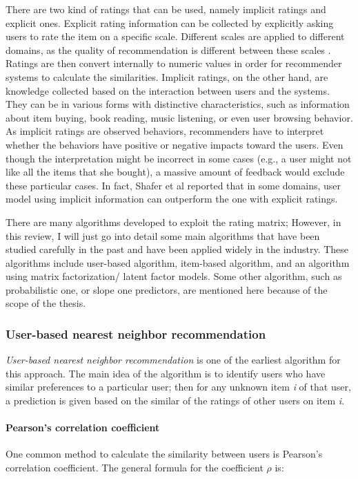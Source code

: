 There are two kind of ratings that can be used, namely implicit ratings and explicit ones. Explicit rating information can be collected by explicitly asking users to rate the item on a specific scale. Different scales are applied to different domains, as the quality of recommendation is different between these scales \cite{cosley2003seeing}. Ratings are then convert internally to numeric values in order for recommender systems to calculate the similarities. Implicit ratings, on the other hand, are knowledge collected based on the interaction between users and the systems. They can be in various forms with distinctive characteristics, such as information about item buying, book reading, music listening, or even user browsing behavior. As implicit ratings are observed behaviors, recommenders have to interpret whether the behaviors have positive or negative impacts toward the users. Even though the interpretation might be incorrect in some cases (e.g., a user might not like all the items that she bought), a massive amount of feedback would exclude these particular cases. In fact, Shafer et al \cite{schafer2006recommender} reported that in some domains, user model using implicit information can outperform the one with explicit ratings.

There are many algorithms developed to exploit the rating matrix; However, in this review, I will just go into detail some main algorithms that have been studied carefully in the past and have been applied widely in the industry. These algorithms include user-based algorithm, item-based algorithm, and an algorithm using matrix factorization/ latent factor models. Some other algorithm, such as probabilistic one, or slope one predictors, are mentioned here because of the scope of the thesis.

\subsubsection{User-based nearest neighbor recommendation}
\textit{User-based nearest neighbor recommendation} is one of the earliest algorithm for this approach. The main idea of the algorithm is to identify users who have similar preferences to a particular user; then for any unknown item \textit{i} of that user, a prediction is given based on the similar of the ratings of other users on item \textit{i}.

\paragraph{Pearson's correlation coefficient}
One common method to calculate the similarity between users is Pearson's correlation coefficient. The general formula for the coefficient \(\rho\) \cite{benesty2009pearson} is:

